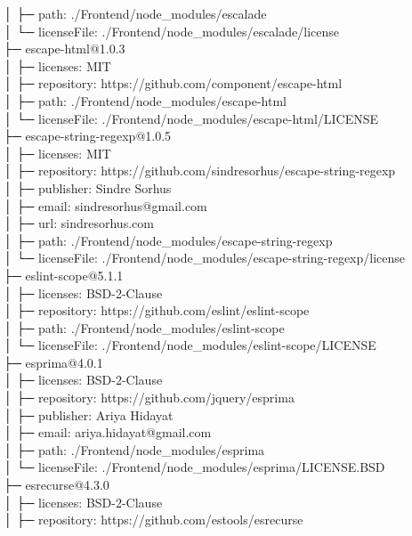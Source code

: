 \documentclass[
    paper=a4,
    twoside=false,
    parskip=half,
    listof=entryprefix,
    listof=totoc,
    index=totoc,
    bibliography=totoc,
    headsepline,
]{scrbook}
\begin{document}
    │  ├─ path: ./Frontend/node\_modules/escalade\\
    │  └─ licenseFile: ./Frontend/node\_modules/escalade/license\\
    ├─ escape-html@1.0.3\\
    │  ├─ licenses: MIT\\
    │  ├─ repository: https://github.com/component/escape-html\\
    │  ├─ path: ./Frontend/node\_modules/escape-html\\
    │  └─ licenseFile: ./Frontend/node\_modules/escape-html/LICENSE\\
    ├─ escape-string-regexp@1.0.5\\
    │  ├─ licenses: MIT\\
    │  ├─ repository: https://github.com/sindresorhus/escape-string-regexp\\
    │  ├─ publisher: Sindre Sorhus\\
    │  ├─ email: sindresorhus@gmail.com\\
    │  ├─ url: sindresorhus.com\\
    │  ├─ path: ./Frontend/node\_modules/escape-string-regexp\\
    │  └─ licenseFile: ./Frontend/node\_modules/escape-string-regexp/license\\
    ├─ eslint-scope@5.1.1\\
    │  ├─ licenses: BSD-2-Clause\\
    │  ├─ repository: https://github.com/eslint/eslint-scope\\
    │  ├─ path: ./Frontend/node\_modules/eslint-scope\\
    │  └─ licenseFile: ./Frontend/node\_modules/eslint-scope/LICENSE\\
    ├─ esprima@4.0.1\\
    │  ├─ licenses: BSD-2-Clause\\
    │  ├─ repository: https://github.com/jquery/esprima\\
    │  ├─ publisher: Ariya Hidayat\\
    │  ├─ email: ariya.hidayat@gmail.com\\
    │  ├─ path: ./Frontend/node\_modules/esprima\\
    │  └─ licenseFile: ./Frontend/node\_modules/esprima/LICENSE.BSD\\
    ├─ esrecurse@4.3.0\\
    │  ├─ licenses: BSD-2-Clause\\
    │  ├─ repository: https://github.com/estools/esrecurse\\
\end{document}
